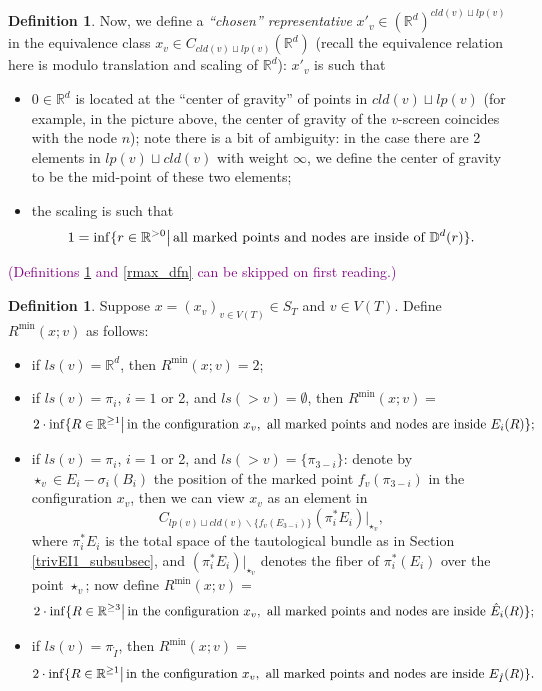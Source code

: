 \documentclass[11pt]{article}
\theoremstyle{definition}
\newtheorem{dfn}[thm]{Definition}
\theoremstyle{remark}
\def\R{\mathbb{R}}
\def\D{\mathbb{D}}
\def\rI{{\mathring{I}}}
\def\cmt#1{\textcolor{purple}{(#1)}}
\def\tn#1{\textnormal{#1}}
\begin{document}
\begin{dfn}\label{screennormalize_dfn}
Now, 
we define a {\it ``chosen'' representative} $x'_v\in (\R^d)^{cld(v)\sqcup lp(v)}$ 
in the equivalence class $x_v\in C_{cld(v)\sqcup lp(v)}(\R^d)$ (recall the equivalence relation here is modulo translation and scaling of $\R^d$):
$x'_v$ is such that 
\begin{itemize}
\item $0\in\R^d$ is located at the ``center of gravity'' of points in $cld(v)\sqcup lp(v)$ (for example, in the picture above, the center of gravity of the $v$-screen coincides with the node $n$); note there is a bit of ambiguity: in the case there are 2 elements in $lp(v)\sqcup cld(v)$ with weight $\infty$, we define the center of gravity to be the mid-point of these two elements; 

\item the scaling is such that 
$$1=\inf\{r\in\R^{>0}\big|\,\tn{all marked points and nodes are inside of }\D^d(r)\}.$$
\end{itemize}
\end{dfn}

\cmt{Definitions \ref{Rmin_dfn} and \ref{rmax_dfn} can be skipped on first reading.}

\begin{dfn}\label{Rmin_dfn}
Suppose $x=(x_v)_{v\in V(T)}\in S_T$ and $v\in V(T)$. Define $R^{\min}(x;v)$ as follows: 
\begin{itemize}
\item if $ls(v)=\R^d$, then $R^{\min}(x;v)=2$;
\item if $ls(v)=\pi_i$, $i=1$ or 2, and $ls(>v)=\emptyset$, 
then $R^{\min}(x;v)=$
$$2\cdot\inf\{R\in\R^{\ge1}\big|\,\tn{in the configuration }x_v,\tn{ all marked points and nodes are inside }E_i(R)\};$$
\item if $ls(v)=\pi_i$, $i=1$ or 2, and $ls(>v)=\{\pi_{3-i}\}$: denote by $\star_v\in E_i-\sigma_i(B_i)$ the position of the marked point $f_v(\pi_{3-i})$ in the configuration $x_v$, then we can view $x_v$ as an element in 
$$C_{lp(v)\sqcup cld(v)\backslash\{f_v(E_{3-i})\}}(\pi_i^*E_i)|_{\star_v},$$
where $\pi_i^*E_i$ is the total space of 
the tautological bundle as in Section \ref{trivEI1_subsubsec}, and $(\pi_i^*E_i)|_{\star_v}$ denotes the fiber of $\pi_i^*(E_i)$ over the point $\star_v$;
now define $R^{\min}(x;v)=$
$$2\cdot\inf\{R\in\R^{\ge3}\big|\,\tn{in the configuration }x_v,\tn{ all marked points and nodes are inside }\hat E_i(R)\};$$
\item if $ls(v)=\pi_\rI$, then $R^{\min}(x;v)=$
$$2\cdot\inf\{R\in\R^{\ge1}\big|\,\tn{in the configuration }x_v,\tn{ all marked points and nodes are inside }E_\rI(R)\}.$$
\end{itemize}
\end{dfn}
\end{document}
